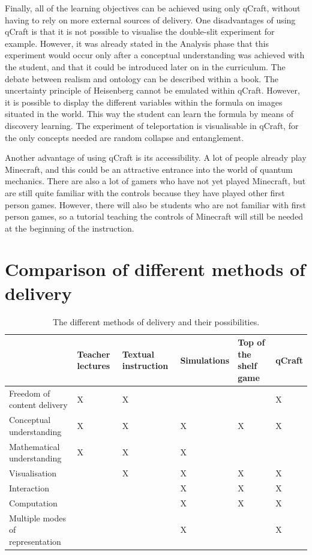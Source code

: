 \documentclass[11pt,twoside]{report} %
\begin{document}
Finally, all of the learning objectives can be achieved using only qCraft, without having to rely on more external sources of delivery. One disadvantages of using qCraft is that it is not possible to visualise the double-slit experiment for example. However, it was already stated in the Analysis phase that this experiment would occur only after a conceptual understanding was achieved with the student, and that it could be introduced later on in the curriculum. The debate between realism and ontology can be described within a book. The uncertainty principle of Heisenberg cannot be emulated within qCraft. However, it is possible to display the different variables within the formula on images situated in the world. This way the student can learn the formula by means of discovery learning. The experiment of teleportation is visualisable in qCraft, for the only concepts needed are random collapse and entanglement.

Another advantage of using qCraft is its accessibility. A lot of people already play Minecraft, and this could be an attractive entrance into the world of quantum mechanics. There are also a lot of gamers who have not yet played Minecraft, but are still quite familiar with the controls because they have played other first person games. However, there will also be students who are not familiar with first person games, so a tutorial teaching the controls of Minecraft will still be needed at the beginning of the instruction.

\section{Comparison of different methods of delivery}

\begin{table}[htbp]
\centering
\begin{tabular}{|p{3cm}|p{2cm}|p{2cm}|p{2cm}|p{2cm}|p{2cm}|}
\hline
 & Teacher lectures & Textual instruction & Simulations & Top of the shelf game & qCraft \\ \hline
Freedom of content delivery & X & X &  &  & X \\ \hline
Conceptual understanding & X & X & X & X & X \\ \hline
Mathematical understanding & X & X & X &  &  \\ \hline
Visualisation &  & X & X & X & X \\ \hline
Interaction &  &  & X & X & X \\ \hline
Computation &  &  & X & X & X \\ \hline
Multiple modes of representation &  &  & X &  & X \\ \hline
\end{tabular}
\caption{The different methods of delivery and their possibilities.\label{tab:comparisonsmedia}}
\end{table}
\end{document}
